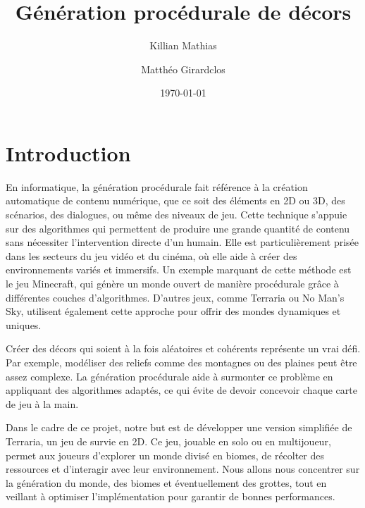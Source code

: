 \documentclass[12pt]{article}
\author{Killian Mathias}{I}
\author{Matthéo Girardclos}{II}
\title{Génération procédurale de décors}
\date{\today}
\begin{document}
\maketitle
\newpage

\tableofcontents
\newpage

\section{Introduction}

En informatique, la génération procédurale fait référence à la création automatique de contenu numérique, que ce soit des éléments en 2D ou 3D, des scénarios, des dialogues, ou même des niveaux de jeu. Cette technique s'appuie sur des algorithmes qui permettent de produire une grande quantité de contenu sans nécessiter l'intervention directe d'un humain. Elle est particulièrement prisée dans les secteurs du jeu vidéo et du cinéma, où elle aide à créer des environnements variés et immersifs.  Un exemple marquant de cette méthode est le jeu Minecraft, qui génère un monde ouvert de manière procédurale grâce à différentes couches d'algorithmes. D'autres jeux, comme Terraria ou No Man’s Sky, utilisent également cette approche pour offrir des mondes dynamiques et uniques.\par
Créer des décors qui soient à la fois aléatoires et cohérents représente un vrai défi. Par exemple, modéliser des reliefs comme des montagnes ou des plaines peut être assez complexe. La génération procédurale aide à surmonter ce problème en appliquant des algorithmes adaptés, ce qui évite de devoir concevoir chaque carte de jeu à la main.\par
Dans le cadre de ce projet, notre but est de développer une version simplifiée de Terraria, un jeu de survie en 2D. Ce jeu, jouable en solo ou en multijoueur, permet aux joueurs d'explorer un monde divisé en biomes, de récolter des ressources et d'interagir avec leur environnement. Nous allons nous concentrer sur la génération du monde, des biomes et éventuellement des grottes, tout en veillant à optimiser l'implémentation pour garantir de bonnes performances.
\end{document}
